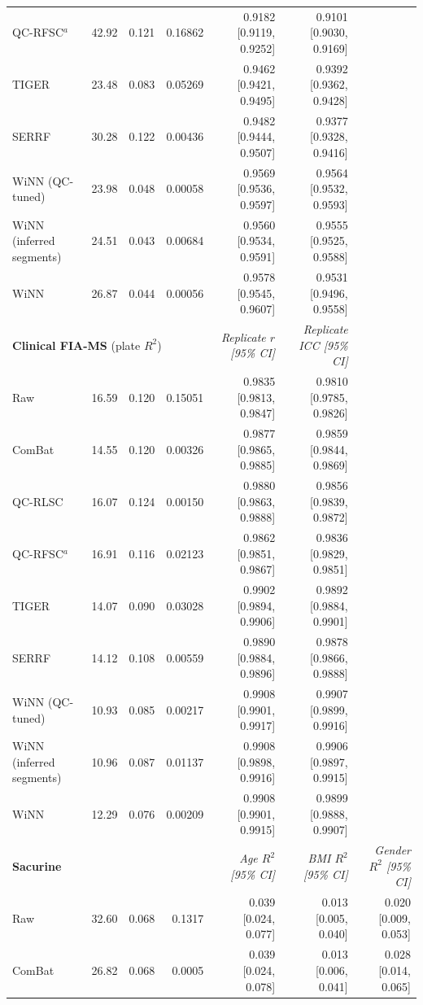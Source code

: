 \begin{landscape}
\begin{longtable}{lrrrrrr}
QC-RFSC$^{a}$ & 42.92 & 0.121 & 0.16862 & 0.9182 [0.9119, 0.9252] & 0.9101 [0.9030, 0.9169] &  \\
TIGER & 23.48 & 0.083 & 0.05269 & 0.9462 [0.9421, 0.9495] & 0.9392 [0.9362, 0.9428] &  \\
SERRF & 30.28 & 0.122 & 0.00436 & 0.9482 [0.9444, 0.9507] & 0.9377 [0.9328, 0.9416] &  \\
WiNN (QC-tuned) & 23.98 & 0.048 & 0.00058 & 0.9569 [0.9536, 0.9597] & 0.9564 [0.9532, 0.9593] &  \\
WiNN (inferred segments) & 24.51 & 0.043 & 0.00684 & 0.9560 [0.9534, 0.9591] & 0.9555 [0.9525, 0.9588] &  \\
WiNN & 26.87 & 0.044 & 0.00056 & 0.9578 [0.9545, 0.9607] & 0.9531 [0.9496, 0.9558] &  \\
\midrule
\multicolumn{4}{l}{\textbf{Clinical FIA-MS} (plate $R^2$)} & \textit{Replicate $r$ [95\% CI]} & \textit{Replicate ICC [95\% CI]} &  \\
\midrule
Raw & 16.59 & 0.120 & 0.15051 & 0.9835 [0.9813, 0.9847] & 0.9810 [0.9785, 0.9826] &  \\
ComBat & 14.55 & 0.120 & 0.00326 & 0.9877 [0.9865, 0.9885] & 0.9859 [0.9844, 0.9869] &  \\
QC-RLSC & 16.07 & 0.124 & 0.00150 & 0.9880 [0.9863, 0.9888] & 0.9856 [0.9839, 0.9872] &  \\
QC-RFSC$^{a}$ & 16.91 & 0.116 & 0.02123 & 0.9862 [0.9851, 0.9867] & 0.9836 [0.9829, 0.9851] &  \\
TIGER & 14.07 & 0.090 & 0.03028 & 0.9902 [0.9894, 0.9906] & 0.9892 [0.9884, 0.9901] &  \\
SERRF & 14.12 & 0.108 & 0.00559 & 0.9890 [0.9884, 0.9896] & 0.9878 [0.9866, 0.9888] &  \\
WiNN (QC-tuned) & 10.93 & 0.085 & 0.00217 & 0.9908 [0.9901, 0.9917] & 0.9907 [0.9899, 0.9916] &  \\
WiNN (inferred segments) & 10.96 & 0.087 & 0.01137 & 0.9908 [0.9898, 0.9916] & 0.9906 [0.9897, 0.9915] &  \\
WiNN & 12.29 & 0.076 & 0.00209 & 0.9908 [0.9901, 0.9915] & 0.9899 [0.9888, 0.9907] &  \\
\midrule
\multicolumn{4}{l}{\textbf{Sacurine}} & \textit{Age $R^2$ [95\% CI]} & \textit{BMI $R^2$ [95\% CI]} & \textit{Gender $R^2$ [95\% CI]} \\
\midrule
Raw & 32.60 & 0.068 & 0.1317 & 0.039 [0.024, 0.077] & 0.013 [0.005, 0.040] & 0.020 [0.009, 0.053] \\
ComBat & 26.82 & 0.068 & 0.0005 & 0.039 [0.024, 0.078] & 0.013 [0.006, 0.041] & 0.028 [0.014, 0.065] \\

\end{longtable}
\end{landscape}
